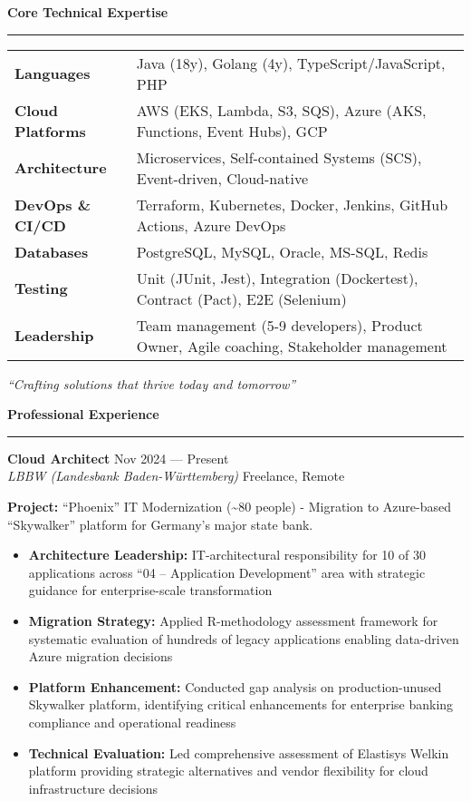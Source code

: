 \documentclass[11pt,a4paper]{article}
\newcommand{\sectiontitle}[1]{%
  \vspace{8pt}
  {\color{darkblue}\Large\bfseries #1}
  \vspace{4pt}
  \hrule
  \vspace{6pt}
}
\newcommand{\jobtitle}[4]{%
  \vspace{4pt}
  {\bfseries #1} \hfill {\color{lightgray}\small #2}\\
  {\itshape #3} \hfill {\color{lightgray}\small #4}
  \vspace{2pt}
}
\begin{document}
\vspace{4pt}

\sectiontitle{Core Technical Expertise}

\begin{tabular}{@{}p{}@{}p{}@{}}
\textbf{Languages} & Java (18y), Golang (4y), TypeScript/JavaScript, PHP \\
\textbf{Cloud Platforms} & AWS (EKS, Lambda, S3, SQS), Azure (AKS, Functions, Event Hubs), GCP \\
\textbf{Architecture} & Microservices, Self-contained Systems (SCS), Event-driven, Cloud-native \\
\textbf{DevOps \& CI/CD} & Terraform, Kubernetes, Docker, Jenkins, GitHub Actions, Azure DevOps \\
\textbf{Databases} & PostgreSQL, MySQL, Oracle, MS-SQL, Redis \\
\textbf{Testing} & Unit (JUnit, Jest), Integration (Dockertest), Contract (Pact), E2E (Selenium) \\
\textbf{Leadership} & Team management (5-9 developers), Product Owner, Agile coaching, Stakeholder management \\
\end{tabular}

\vspace{4pt}

\begin{center}
\textit{``Crafting solutions that thrive today and tomorrow''}
\end{center}

\vfill

\newpage

\sectiontitle{Professional Experience}

\jobtitle{Cloud Architect}{Nov 2024 --- Present}{LBBW (Landesbank Baden-Württemberg)}{Freelance, Remote}

\textbf{Project:} ``Phoenix'' IT Modernization (\textasciitilde{}80 people) - Migration to Azure-based ``Skywalker'' platform for Germany's major state bank.

\begin{itemize}
\item \textbf{Architecture Leadership:} IT-architectural responsibility for 10 of 30 applications across ``04 -- Application Development'' area with strategic guidance for enterprise-scale transformation
\item \textbf{Migration Strategy:} Applied R-methodology assessment framework for systematic evaluation of hundreds of legacy applications enabling data-driven Azure migration decisions
\item \textbf{Platform Enhancement:} Conducted gap analysis on production-unused Skywalker platform, identifying critical enhancements for enterprise banking compliance and operational readiness
\item \textbf{Technical Evaluation:} Led comprehensive assessment of Elastisys Welkin platform providing strategic alternatives and vendor flexibility for cloud infrastructure decisions
\end{itemize}
\end{document}
